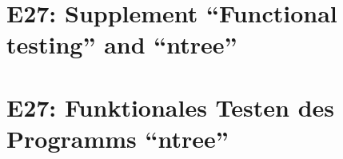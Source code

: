 
\thispagestyle{empty}
\ifenglish
\section*{E27: Supplement ``Functional testing'' and ``ntree''}

\fi
\ifgerman
\section*{E27: Funktionales Testen des Programms "`ntree"'}

\fi

